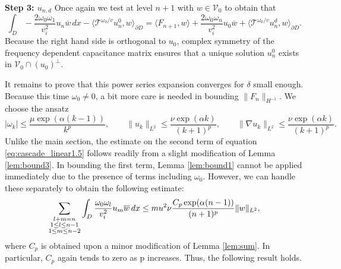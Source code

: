 \documentclass[a4paper,reqno,twoside]{amsart}
\numberwithin{equation}{section}
\theoremstyle{definition}
\newcommand{\<}{\ensuremath \leq}
\renewcommand{\>}{\ensuremath \geq}
\begin{document}
\textbf{Step 3: $u_{n,d}$} Once again we test at level $n+1$ with $w\in \mathcal{V}_0$ to obtain that
\begin{equation}
    \int_{D} - \dfrac{2\omega_0\omega_1}{v_i^2}u_{n}\overline{w}  \, dx - \langle\mathcal{T}^{\omega_0/v}u^0_{n},w\rangle_{\partial D} =  \langle F_{n+1},w\rangle +\frac{2\omega_0\omega_n}{v_i^2}u_0\overline{w} + \langle\mathcal{T}^{\omega_0/v}u^d_{n},w\rangle_{\partial D}.
\end{equation}
Because the right hand side is orthogonal to $u_0$, complex symmetry of the frequency dependent capacitance matrix ensures that a unique solution $u^0_{n}$ exists in $\mathcal{V}_0\cap (u_0)^\perp$. 

It remains to prove that this power series expansion converges for $\delta$ small enough. Because this time $\omega_0\neq 0$, a bit more care is needed in bounding $\lVert F_{n}\rVert_{H^{-1}}$. We choose the ansatz
\begin{equation}
        \lvert \omega_k \rvert \leq \frac{\mu \exp(\alpha(k-1))}{k^p},
        \qquad
        \lVert u_k \rVert_{L^2} \leq \frac{\nu \exp(\alpha k)}{(k+1)^p},
        \qquad
        \lVert \nabla u_k \rVert_{L^2} \leq \frac{\nu \exp(\alpha k)}{(k+1)^p}.
\end{equation}
Unlike the main section, the estimate on the second term of equation \eqref{eq:cascade_linear1.5} follows readily from a slight modification of Lemma \ref{lem:bound3}. In bounding the first term, Lemma \ref{lem:bound1} cannot be applied immediately due to the presence of terms including $\omega_0$. However, we can handle these separately to obtain the following estimate:
\begin{equation}
    \sum_{\substack{l+m = n\\
    1\leq l \leq n-1\\1\leq m \leq n-2}}\int_D\frac{\omega_0\omega_l}{v_i^2}u_m\overline{w}\,dx\leq\\mu^2\nu \frac{C_p\exp(\alpha(n-1))}{(n+1)^p}\lVert w\rVert_{L^2},
\end{equation}
where $C_p$ is obtained upon a minor modification of Lemma \ref{lem:sum}. In particular, $C_p$ again tends to zero as p increases. Thus, the following result holds. 
\end{document}
